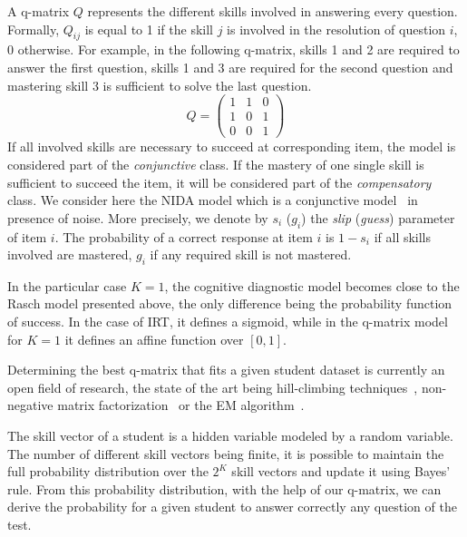 \documentclass{sig-alternate}
\begin{document}
A q-matrix $Q$ \cite{Tatsuoka1983} represents the different skills involved in answering every question. Formally, $Q_{ij}$ is equal to 1 if the skill $j$ is involved in the resolution of question $i$, 0 otherwise. For example, in the following q-matrix, skills 1 and 2 are required to answer the first question, skills 1 and 3 are required for the second question and mastering skill 3 is sufficient to solve the last question.
\[ Q = \left(\begin{array}{lll}
1 & 1 & 0\\
1 & 0 & 1\\
0 & 0 & 1
\end{array}\right) \]
If all involved skills are necessary to succeed at corresponding item, the model is considered part of the \emph{conjunctive} class. 
If the mastery of one single skill is sufficient to succeed the item, it will be considered part of the \emph{compensatory} class. We consider here the NIDA model which is a conjunctive model~\cite{Desmarais2012} in presence of noise. More precisely, we denote by $s_i$ ($g_i$) the \emph{slip} (\emph{guess}) parameter of item $i$. The probability of a correct response at item $i$ is $1 - s_i$ if all skills involved are mastered, $g_i$ if any required skill is not mastered.

In the particular case $K=1$, the cognitive diagnostic model becomes close to the Rasch model presented above, the only difference being the probability function of success. In the case of IRT, it defines a sigmoid, while in the q-matrix model for $K = 1$ it defines an affine function over $[0,1]$.

Determining the best q-matrix that fits a given student dataset is currently an open field of research, the state of the art being hill-climbing techniques~\cite{Barnes2005}, non-negative matrix factorization~\cite{Desmarais2011} or the EM algorithm~\cite{Huebner2010}. 

The skill vector of a student is a hidden variable modeled by a random variable. The number of different skill vectors being finite, it is possible to maintain the full probability distribution over the $2^K$ skill vectors and update it using Bayes' rule. From this probability distribution, with the help of our q-matrix, we can derive the probability for a given student to answer correctly any question of the test.

\end{document}
